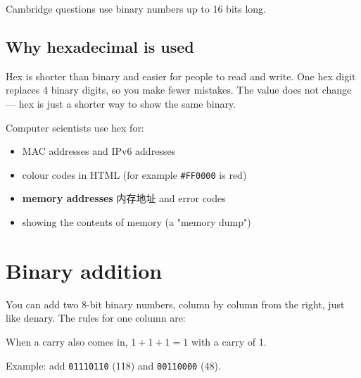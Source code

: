 \documentclass[11pt]{article}
\begin{document}
Cambridge questions use binary numbers up to 16 bits long.

\subsection*{Why hexadecimal is used}

Hex is shorter than binary and easier for people to read and write. One hex digit replaces 4 binary digits, so you make fewer mistakes. The value does not change — hex is just a shorter way to show the same binary.

Computer scientists use hex for:

\begin{itemize}
\item MAC addresses and IPv6 addresses

\item colour codes in HTML (for example \texttt{\#FF0000} is red)

\item \textbf{memory addresses} 内存地址 and error codes

\item showing the contents of memory (a "memory dump")

\end{itemize}

\section*{Binary addition}

You can add two 8-bit binary numbers, column by column from the right, just like denary. The rules for one column are:

\begin{center}
\end{center}

When a carry also comes in, $1 + 1 + 1 = 1$ with a carry of 1.

Example: add \texttt{01110110} (118) and \texttt{00110000} (48).
\end{document}
